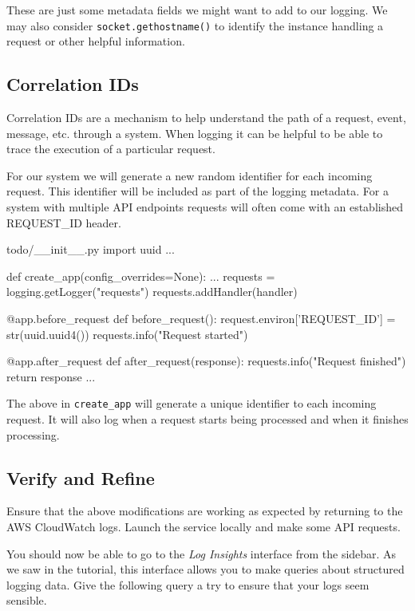 \documentclass{csse4400}
\begin{document}
These are just some metadata fields we might want to add to our logging.
We may also consider \texttt{socket.gethostname()} to identify the instance handling a request or other helpful information.

\subsection{Correlation IDs}

Correlation IDs are a mechanism to help understand the path of a request, event, message, etc. through a system.
When logging it can be helpful to be able to trace the execution of a particular request.

For our system we will generate a new random identifier for each incoming request.
This identifier will be included as part of the logging metadata.
For a system with multiple API endpoints requests will often come with an established REQUEST\_ID header.

\begin{code}[language=python,numbers=none]{todo/\_\_init\_\_.py}
import uuid
...

def create_app(config_overrides=None): 
    ...
    requests = logging.getLogger("requests")
    requests.addHandler(handler)

    @app.before_request
    def before_request():
       request.environ['REQUEST_ID'] = str(uuid.uuid4())
       requests.info("Request started")

    @app.after_request
    def after_request(response):
       requests.info("Request finished")
       return response
    ...
\end{code}

The above in \texttt{create\_app} will generate a unique identifier to each incoming request.
It will also log when a request starts being processed and when it finishes processing.


\subsection{Verify and Refine}
Ensure that the above modifications are working as expected by returning to the AWS CloudWatch logs.
Launch the service locally and make some API requests.

You should now be able to go to the \textsl{Log Insights} interface from the sidebar.
As we saw in the tutorial,
this interface allows you to make queries about structured logging data.
Give the following query a try to ensure that your logs seem sensible.
\end{document}
